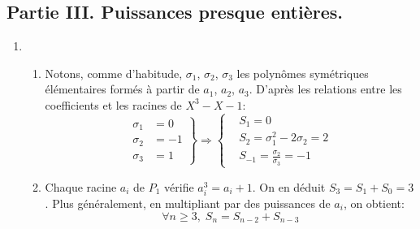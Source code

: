 \subsection*{Partie III. Puissances presque entières.}
\begin{enumerate}
 \item
\begin{enumerate}
 \item Notons, comme d'habitude, $\sigma_1$, $\sigma_2$, $\sigma_3$ les polynômes symétriques élémentaires formés à partir de $a_1$, $a_2$, $a_3$. D'après les relations entre les coefficients et les racines de $X^3-X-1$:
\begin{displaymath}
\left. 
\begin{aligned}
\sigma_1 &=0\\ \sigma_2 &= -1 \\ \sigma_3 &= 1
\end{aligned}
\right\rbrace  \Rightarrow
\left\lbrace 
\begin{aligned}
&S_1=0\\ &S_2 = \sigma_1^2-2\sigma_2=2\\&S_{-1}=\frac{\sigma_2}{\sigma_3}=-1 
\end{aligned}
\right. 
\end{displaymath}

 \item Chaque racine $a_i$ de $P_1$ vérifie $a_i^3 = a_i+1$. On en déduit $S_3=S_1+S_0=3$. Plus généralement, en multipliant par des puissances de $a_i$, on obtient:
\begin{displaymath}
 \forall n\geq 3,\; S_n = S_{n-2}+S_{n-3}
\end{displaymath}
\end{enumerate}
 

\end{enumerate}
